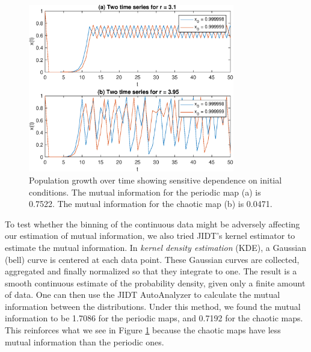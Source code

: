 \documentclass[conference]{IEEEtran}
\begin{document}
\begin{figure}[t]
\centering
 \includegraphics[width=90mm]{figure1abcd_combined}
  \caption{ Population growth over time showing sensitive dependence on initial conditions.  The mutual information for the periodic map (a) is 0.7522.  The mutual information for the chaotic map (b) is 0.0471.}
 \label{figure1abcd}
\end{figure} 
\noindent To test whether the binning of the continuous data might be adversely affecting our estimation of mutual information, we also tried JIDT's kernel estimator to estimate the mutual information. In {\it kernel density estimation} (KDE), a Gaussian (bell) curve is centered at each data point. These Gaussian curves are collected, aggregated and finally normalized so that they integrate to one. The result is a smooth continuous estimate of the probability density, given only a finite amount of data\cite{Moon}.  One can then use the JIDT AutoAnalyzer to calculate the mutual information between the distributions.   Under this method, we found the mutual information to be 1.7086 for the periodic maps, and 0.7192 for the chaotic maps.  This reinforces what we see in Figure \ref{figure1abcd} because the chaotic maps have less mutual information than the periodic ones.    
\end{document}
